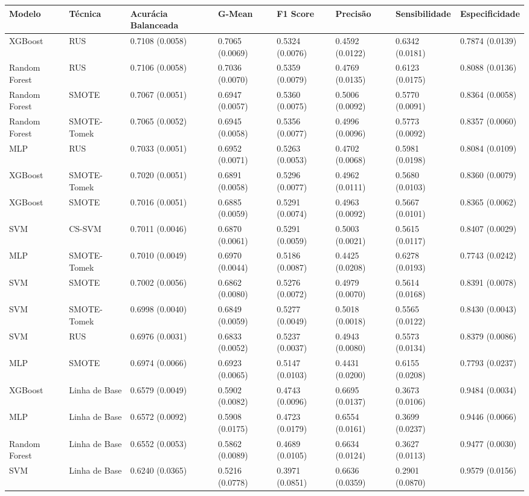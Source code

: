\begin{tabular}{llllllll}
\toprule
Modelo & Técnica & Acurácia Balanceada & G-Mean & F1 Score & Precisão & Sensibilidade & Especificidade \\
\midrule
XGBoost & RUS & 0.7108 (0.0058) & 0.7065 (0.0069) & 0.5324 (0.0076) & 0.4592 (0.0122) & 0.6342 (0.0181) & 0.7874 (0.0139) \\
Random Forest & RUS & 0.7106 (0.0058) & 0.7036 (0.0070) & 0.5359 (0.0079) & 0.4769 (0.0135) & 0.6123 (0.0175) & 0.8088 (0.0136) \\
Random Forest & SMOTE & 0.7067 (0.0051) & 0.6947 (0.0057) & 0.5360 (0.0075) & 0.5006 (0.0092) & 0.5770 (0.0091) & 0.8364 (0.0058) \\
Random Forest & SMOTE-Tomek & 0.7065 (0.0052) & 0.6945 (0.0058) & 0.5356 (0.0077) & 0.4996 (0.0096) & 0.5773 (0.0092) & 0.8357 (0.0060) \\
MLP & RUS & 0.7033 (0.0051) & 0.6952 (0.0071) & 0.5263 (0.0053) & 0.4702 (0.0068) & 0.5981 (0.0198) & 0.8084 (0.0109) \\
XGBoost & SMOTE-Tomek & 0.7020 (0.0051) & 0.6891 (0.0058) & 0.5296 (0.0077) & 0.4962 (0.0111) & 0.5680 (0.0103) & 0.8360 (0.0079) \\
XGBoost & SMOTE & 0.7016 (0.0051) & 0.6885 (0.0059) & 0.5291 (0.0074) & 0.4963 (0.0092) & 0.5667 (0.0101) & 0.8365 (0.0062) \\
SVM & CS-SVM & 0.7011 (0.0046) & 0.6870 (0.0061) & 0.5291 (0.0059) & 0.5003 (0.0021) & 0.5615 (0.0117) & 0.8407 (0.0029) \\
MLP & SMOTE-Tomek & 0.7010 (0.0049) & 0.6970 (0.0044) & 0.5186 (0.0087) & 0.4425 (0.0208) & 0.6278 (0.0193) & 0.7743 (0.0242) \\
SVM & SMOTE & 0.7002 (0.0056) & 0.6862 (0.0080) & 0.5276 (0.0072) & 0.4979 (0.0070) & 0.5614 (0.0168) & 0.8391 (0.0078) \\
SVM & SMOTE-Tomek & 0.6998 (0.0040) & 0.6849 (0.0059) & 0.5277 (0.0049) & 0.5018 (0.0018) & 0.5565 (0.0122) & 0.8430 (0.0043) \\
SVM & RUS & 0.6976 (0.0031) & 0.6833 (0.0052) & 0.5237 (0.0037) & 0.4943 (0.0080) & 0.5573 (0.0134) & 0.8379 (0.0086) \\
MLP & SMOTE & 0.6974 (0.0066) & 0.6923 (0.0065) & 0.5147 (0.0103) & 0.4431 (0.0200) & 0.6155 (0.0208) & 0.7793 (0.0237) \\
XGBoost & Linha de Base & 0.6579 (0.0049) & 0.5902 (0.0082) & 0.4743 (0.0096) & 0.6695 (0.0137) & 0.3673 (0.0106) & 0.9484 (0.0034) \\
MLP & Linha de Base & 0.6572 (0.0092) & 0.5908 (0.0175) & 0.4723 (0.0179) & 0.6554 (0.0161) & 0.3699 (0.0237) & 0.9446 (0.0066) \\
Random Forest & Linha de Base & 0.6552 (0.0053) & 0.5862 (0.0089) & 0.4689 (0.0105) & 0.6634 (0.0124) & 0.3627 (0.0113) & 0.9477 (0.0030) \\
SVM & Linha de Base & 0.6240 (0.0365) & 0.5216 (0.0778) & 0.3971 (0.0851) & 0.6636 (0.0359) & 0.2901 (0.0870) & 0.9579 (0.0156) \\
\bottomrule
\end{tabular}
